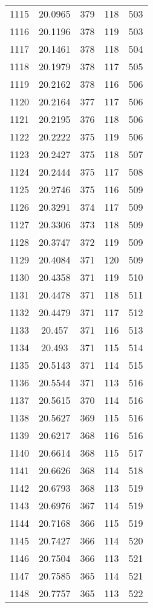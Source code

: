 \documentclass[12pt,a4paper]{article}
\begin{document}
\begin{tabular}{r|cccc}
	1115 & 20.0965 & 379 & 118 & 503 \\
	1116 & 20.1196 & 378 & 119 & 503 \\
	1117 & 20.1461 & 378 & 118 & 504 \\
	1118 & 20.1979 & 378 & 117 & 505 \\
	1119 & 20.2162 & 378 & 116 & 506 \\
	1120 & 20.2164 & 377 & 117 & 506 \\
	1121 & 20.2195 & 376 & 118 & 506 \\
	1122 & 20.2222 & 375 & 119 & 506 \\
	1123 & 20.2427 & 375 & 118 & 507 \\
	1124 & 20.2444 & 375 & 117 & 508 \\
	1125 & 20.2746 & 375 & 116 & 509 \\
	1126 & 20.3291 & 374 & 117 & 509 \\
	1127 & 20.3306 & 373 & 118 & 509 \\
	1128 & 20.3747 & 372 & 119 & 509 \\
	1129 & 20.4084 & 371 & 120 & 509 \\
	1130 & 20.4358 & 371 & 119 & 510 \\
	1131 & 20.4478 & 371 & 118 & 511 \\
	1132 & 20.4479 & 371 & 117 & 512 \\
	1133 & 20.457 & 371 & 116 & 513 \\
	1134 & 20.493 & 371 & 115 & 514 \\
	1135 & 20.5143 & 371 & 114 & 515 \\
	1136 & 20.5544 & 371 & 113 & 516 \\
	1137 & 20.5615 & 370 & 114 & 516 \\
	1138 & 20.5627 & 369 & 115 & 516 \\
	1139 & 20.6217 & 368 & 116 & 516 \\
	1140 & 20.6614 & 368 & 115 & 517 \\
	1141 & 20.6626 & 368 & 114 & 518 \\
	1142 & 20.6793 & 368 & 113 & 519 \\
	1143 & 20.6976 & 367 & 114 & 519 \\
	1144 & 20.7168 & 366 & 115 & 519 \\
	1145 & 20.7427 & 366 & 114 & 520 \\
	1146 & 20.7504 & 366 & 113 & 521 \\
	1147 & 20.7585 & 365 & 114 & 521 \\
	1148 & 20.7757 & 365 & 113 & 522 \\

\end{tabular}
\end{document}
